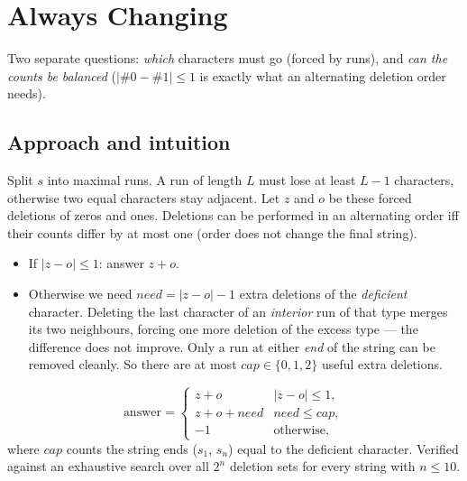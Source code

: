 \section{Always Changing}
\label{sec:g-always-changing}


\begin{patternbox}
Two separate questions: \emph{which} characters must go (forced by runs), and
\emph{can the counts be balanced} ($|\#0-\#1|\le1$ is exactly what an
alternating deletion order needs).
\end{patternbox}

\subsection*{Approach and intuition}

Split $s$ into maximal runs. A run of length $L$ must lose at least $L-1$
characters, otherwise two equal characters stay adjacent. Let $z$ and $o$ be
these forced deletions of zeros and ones. Deletions can be performed in an
alternating order iff their counts differ by at most one (order does not change
the final string).

\begin{itemize}
  \item If $|z-o|\le1$: answer $z+o$.
  \item Otherwise we need $need=|z-o|-1$ extra deletions of the
        \emph{deficient} character. Deleting the last character of an
        \emph{interior} run of that type merges its two neighbours, forcing one
        more deletion of the excess type --- the difference does not improve.
        Only a run at either \emph{end} of the string can be removed cleanly.
        So there are at most $cap\in\{0,1,2\}$ useful extra deletions.
\end{itemize}

\begin{ideabox}[Formula]
\[
  \text{answer}=\begin{cases}
  z+o & |z-o|\le1,\\
  z+o+need & need\le cap,\\
  -1 & \text{otherwise,}
  \end{cases}
\]
where $cap$ counts the string ends ($s_1$, $s_n$) equal to the deficient
character. Verified against an exhaustive search over all $2^n$ deletion
sets for every string with $n\le10$.
\end{ideabox}

